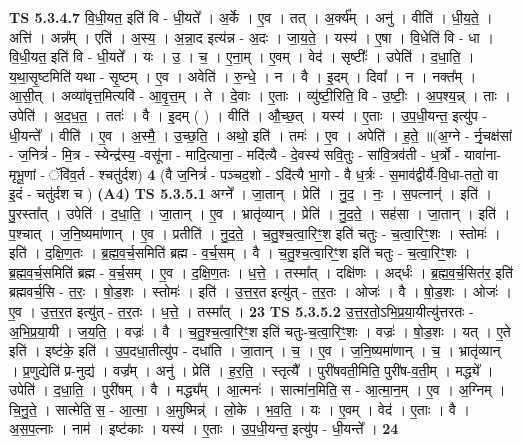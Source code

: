 \documentclass[17pt]{extarticle}
\begin{document}
                  \newline
                                \textbf{ TS 5.3.4.7} \newline
                  वि॒धी॒यत॒ इति॑ वि - धी॒यते᳚ । अ॒र्के । ए॒व । तत् । अ॒र्क्य᳚म् । अनु॑ । वीति॑ । धी॒य॒ते॒ । अत्ति॑ । अन्न᳚म् । एति॑ । अ॒स्य॒ । अ॒न्ना॒द इत्य॑न्न - अ॒दः । जा॒य॒ते॒ । यस्य॑ । ए॒षा । वि॒धेति॑ वि - धा । वि॒धी॒यत॒ इति॑ वि - धी॒यते᳚ । यः । उ॒ । च॒ । ए॒ना॒म् । ए॒वम् । वेद॑ । सृष्टीः᳚ । उपेति॑ । द॒धा॒ति॒ । य॒था॒सृ॒ष्टमिति॑ यथा - सृ॒ष्टम् । ए॒व । अवेति॑ । रु॒न्धे॒ । न । वै । इ॒दम् । दिवा᳚ । न । नक्त᳚म् । आ॒सी॒त् । अव्या॑वृत्त॒मित्यवि॑ - आ॒वृ॒त्त॒म् । ते । दे॒वाः । ए॒ताः । व्यु॑ष्टी॒रिति॒ वि - उ॒ष्टीः॒ । अ॒प॒श्य॒न्न् । ताः । उपेति॑ । अ॒द॒ध॒त॒ । ततः॑ । वै । इ॒दम् ( ) । वीति॑ । औ॒च्छ॒त् । यस्य॑ । ए॒ताः । उ॒प॒धी॒यन्त॒ इत्यु॑प - धी॒यन्ते᳚ । वीति॑ । ए॒व । अ॒स्मै॒ । उ॒च्छ॒ति॒ । अथो॒ इति॑ । तमः॑ । ए॒व । अपेति॑ । ह॒ते॒ ॥(अ॒ग्ने - र्नृ॒चक्ष॑सां - ज॒नित्रं॑ - मि॒त्र - स्येन्द्र॑स्य॒ -वसू॑ना - मादि॒त्याना॒ - मदि॑त्यै - दे॒वस्य॑ सवि॒तुः - सा॑वि॒त्रव॑ती - ध॒र्त्रो - यावा॑ना-मृभू॒णां - ॅवि॑व॒र्त - श्चतु॑र्दश) \textbf{  4} \newline
                  \newline
                      (वै ज॒नित्रं॑ - पञ्चद॒शो - ऽदि॑त्यै भा॒गो - वै ध॒र्त्रः - स॒माव॑द्वीर्यै-वि॒धा-ततो॒ वा इ॒दं - चतु॑र्दश च )  \textbf{(A4)} \newline \newline
                                \textbf{ TS 5.3.5.1} \newline
                  अग्ने᳚ । जा॒तान् । प्रेति॑ । नु॒द॒ । नः॒ । स॒पत्नान्॑ । इति॑ । पु॒रस्ता᳚त् । उपेति॑ । द॒धा॒ति॒ । जा॒तान् । ए॒व । भ्रातृ॑व्यान् । प्रेति॑ । नु॒द॒ते॒ । सह॑सा । जा॒तान् । इति॑ । प॒श्चात् । ज॒नि॒ष्यमा॑णान् । ए॒व । प्रतीति॑ । नु॒द॒ते॒ । च॒तु॒श्च॒त्वा॒रिꣳ॒॒श इति॑ चतुः - च॒त्वा॒रिꣳ॒॒शः । स्तोमः॑ । इति॑ । द॒क्षि॒ण॒तः । ब्र॒ह्म॒व॒र्च॒समिति॑ ब्रह्म - व॒र्च॒सम् । वै । च॒तु॒श्च॒त्वा॒रिꣳ॒॒श इति॑ चतुः - च॒त्वा॒रिꣳ॒॒शः । ब्र॒ह्म॒व॒र्च॒समिति॑ ब्रह्म - व॒र्च॒सम् । ए॒व । द॒क्षि॒ण॒तः । ध॒त्ते॒ । तस्मा᳚त् । दक्षि॑णः । अद्‌र्धः॑ । ब्र॒ह्म॒व॒र्च॒सित॑र॒ इति॑ ब्रह्मवर्च॒सि - त॒रः॒ । षो॒ड॒शः । स्तोमः॑ । इति॑ । उ॒त्त॒र॒त इत्यु॑त् - त॒र॒तः । ओजः॑ । वै । षो॒ड॒शः । ओजः॑ । ए॒व । उ॒त्त॒र॒त इत्यु॑त् - त॒र॒तः । ध॒त्ते॒ । तस्मा᳚त् । \textbf{  23} \newline
                  \newline
                                \textbf{ TS 5.3.5.2} \newline
                  उ॒त्त॒र॒तो॒ऽभि॒प्र॒या॒यीत्यु॑त्तरतः - अ॒भि॒प्र॒या॒यी । ज॒य॒ति॒ । वज्रः॑ । वै । च॒तु॒श्च॒त्वा॒रिꣳ॒॒श इति॑ चतुः-च॒त्वा॒रिꣳ॒॒शः । वज्रः॑ । षो॒ड॒शः । यत् । ए॒ते इति॑ । इष्ट॑के॒ इति॑ । उ॒प॒दधा॒तीत्यु॑प - दधा॑ति । जा॒तान् । च॒ । ए॒व । ज॒नि॒ष्यमा॑णान् । च॒ । भ्रातृ॑व्यान् । प्र॒णुद्येति॑ प्र-नुद्य॑ । वज्र᳚म् । अनु॑ । प्रेति॑ । ह॒र॒ति॒ । स्तृत्यै᳚ । पुरी॑षवती॒मिति॒ पुरी॑ष-व॒ती॒म् । मद्ध्ये᳚ । उपेति॑ । द॒धा॒ति॒ । पुरी॑षम् । वै । मद्ध्य᳚म् । आ॒त्मनः॑ । सात्मा॑न॒मिति॒ स - आ॒त्मा॒न॒म् । ए॒व । अ॒ग्निम् । चि॒नु॒ते॒ । सात्मेति॒ स॒ - आ॒त्मा॒ । अ॒मुष्मिन्न्॑ । लो॒के । भ॒व॒ति॒ । यः । ए॒वम् । वेद॑ । ए॒ताः । वै । अ॒स॒प॒त्नाः । नाम॑ । इष्ट॑काः । यस्य॑ । ए॒ताः । उ॒प॒धी॒यन्त॒ इत्यु॑प - धी॒यन्ते᳚ । \textbf{  24} \newline
\end{document}
